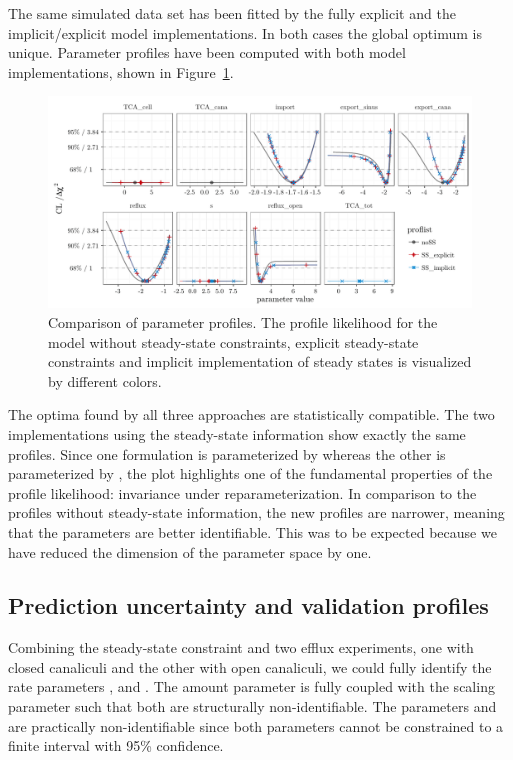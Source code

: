 \documentclass[article]{jss}
\begin{document}
The same simulated data set has been fitted by the fully explicit and the implicit/explicit model implementations. In both cases the global optimum is unique. Parameter profiles have been computed with both model implementations, shown in Figure~\ref{fig:allprofiles}.
\begin{figure}[ht]
	\centering
	\includegraphics[width = \textwidth]{images/figure8}
	\caption{Comparison of parameter profiles. The profile likelihood for the model without steady-state constraints, explicit steady-state constraints and implicit implementation of steady states is visualized by different colors.}
	\label{fig:allprofiles}
\end{figure}
The optima found by all three approaches are statistically compatible. The two implementations using the steady-state information show exactly the same profiles. Since one formulation is parameterized by  whereas the other is parameterized by , the plot highlights one of the fundamental properties of the profile likelihood: invariance under reparameterization. In comparison to the profiles without steady-state information, the new profiles are narrower, meaning that the parameters are better identifiable. This was to be expected because we have reduced the dimension of the parameter space by one.

\subsection{Prediction uncertainty and validation profiles}

Combining the steady-state constraint and two efflux experiments, one with closed canaliculi and the other with open canaliculi, we could fully identify the rate parameters ,  and . The amount parameter  is fully coupled with the scaling parameter  such that both are structurally non-identifiable. The parameters  and  are practically non-identifiable since both parameters cannot be constrained to a finite interval with 95\% confidence.
\end{document}
